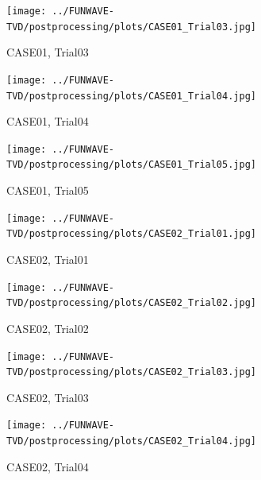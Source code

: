 \documentclass[preprint,10pt]{elsarticle}
\begin{document}
\begin{figure}
\begin{center}
 \texttt{[image: ../FUNWAVE-TVD/postprocessing/plots/CASE01\_Trial03.jpg]}
 \caption{CASE01, Trial03}
 \label{lineargrid}
 \end{center}
 \end{figure}
 
\begin{figure}
\begin{center}
 \texttt{[image: ../FUNWAVE-TVD/postprocessing/plots/CASE01\_Trial04.jpg]}
 \caption{CASE01, Trial04}
 \label{lineargrid}
 \end{center}
 \end{figure}

\begin{figure}
\begin{center}
 \texttt{[image: ../FUNWAVE-TVD/postprocessing/plots/CASE01\_Trial05.jpg]}
 \caption{CASE01, Trial05}
 \label{lineargrid}
 \end{center}
 \end{figure}

\newpage

 \begin{figure}
\begin{center}
 \texttt{[image: ../FUNWAVE-TVD/postprocessing/plots/CASE02\_Trial01.jpg]}
 \caption{CASE02, Trial01}
 \label{lineargrid}
 \end{center}
 \end{figure}

\begin{figure}
\begin{center}
 \texttt{[image: ../FUNWAVE-TVD/postprocessing/plots/CASE02\_Trial02.jpg]}
 \caption{CASE02, Trial02}
 \label{lineargrid}
 \end{center}
 \end{figure}

\begin{figure}
\begin{center}
 \texttt{[image: ../FUNWAVE-TVD/postprocessing/plots/CASE02\_Trial03.jpg]}
 \caption{CASE02, Trial03}
 \label{lineargrid}
 \end{center}
 \end{figure}
 
\begin{figure}
\begin{center}
 \texttt{[image: ../FUNWAVE-TVD/postprocessing/plots/CASE02\_Trial04.jpg]}
 \caption{CASE02, Trial04}
 \label{lineargrid}
 \end{center}
 \end{figure}
\end{document}

